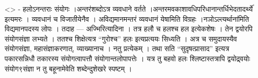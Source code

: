 \textless{}\textgreater{} - हलोऽनन्तराः संयोगः ।अन्तर॑शब्दोऽत्र व्यवधाने
वर्तते ।अन्तरमवकाशावधिपरिधानान्तर्धिभेदतादर्थ्ये॑ इत्यमरः । व्यवधानं च
विजातीयेनैव । अविद्यमानमन्तरं व्यवधानं येषामिति विग्रहः
।नञोऽल्त्यर्थाना॑मिति विद्यमानपदस्य लोपः । तदाह --- अज्भिरित्यादिना ।
तत्र हलौ च हलश्च हल इत्येकशेषः । तेन द्वयोरपि संयोगसंज्ञा लभ्यते । ततश्च
शिक्षेत्यत्र ``गुरोश्च'' हलः इत्यप्रत्ययः सिध्यति । अत्र च समुदायस्यैव
संयोगसंज्ञा, महासंज्ञाकरणात्, व्याख्यानाच । नतु प्रत्येकम् । तथा सति
``सुदृषत्प्रासाद'' इत्यत्र पकारसन्निधौ तकारस्य संयोगत्वापत्तौ
संयोगान्तलोपापत्तेः । यत्र तु बहवो हलः श्लिष्टास्तत्रापि द्वयोद्र्वयोः
संयोग९संज्ञा न तु बहूनामेवेति शब्देन्दुशेखरे स्पष्टम् ।
